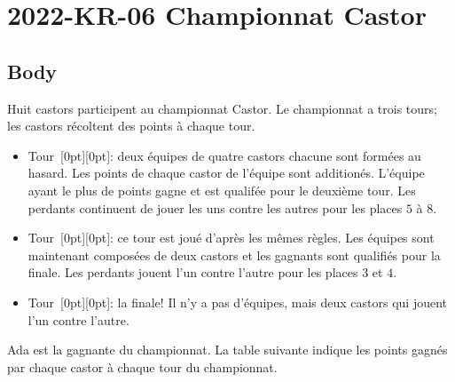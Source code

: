 \documentclass[a4paper,11pt]{report}
\newcommand{\taskGraphicsFolder}{..}
\begin{document}
\section*{\centering{} 2022-KR-06 Championnat Castor}


\subsection*{Body}

Huit castors participent au championnat Castor. Le championnat a trois tours; les castors récoltent des points à chaque tour.

\begin{itemize}
  \item Tour~\raisebox{-0.5ex}[0pt][0pt]{}: deux équipes de quatre castors chacune sont formées au hasard. Les points de chaque castor de l’équipe sont additionés. L’équipe ayant le plus de points gagne et est qualifée pour le deuxième tour. Les perdants continuent de jouer les uns contre les autres pour les places $5$ à $8$.
  \item Tour~\raisebox{-0.5ex}[0pt][0pt]{}: ce tour est joué d’après les mêmes règles. Les équipes sont maintenant composées de deux castors et les gagnants sont qualifiés pour la finale. Les perdants jouent l’un contre l’autre pour les places $3$ et $4$.
  \item Tour~\raisebox{-0.5ex}[0pt][0pt]{}: la finale! Il n’y a pas d’équipes, mais deux castors qui jouent l’un contre l’autre.
\end{itemize}

Ada est la gagnante du championnat. La table suivante indique les points gagnés par chaque castor à chaque tour du championnat.
\end{document}
